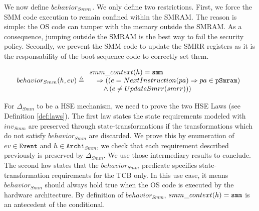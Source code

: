We now define $behavior_{Smm}$. We only define two
restrictions. First, we force the SMM code execution to remain confined within
the SMRAM. The reason is simple: the OS code can tamper with the memory outside
the SMRAM. As a consequence, jumping outside the SMRAM is the best way to fail
the security policy. Secondly, we prevent the SMM code to update the SMRR
registers as it is the responsability of the boot sequence code to correctly set
them.

\[
  behavior_{Smm}(h, ev) \triangleq \begin{array}{l}
                                           smm\_context(h) = \mathtt{smm} \\
                                           \quad \Rightarrow ((e =
                                           NextInstruction(pa)
                                           \Rightarrow pa \in \texttt{pSmram}) \\
                                           \qquad \wedge\,(e \neq UpdateSmrr(smrr))) \\
                                         \end{array}
                                       \]

                                       For $\Delta_{Smm}$ to be a HSE mechanism,
                                       we need to prove the two HSE Laws (see
                                       Definition \ref{def:laws}).  The first
                                       law states the state requirements modeled
                                       with $inv_{Smm}$ are preserved through
                                       state-transformations if the
                                       transformations which do not satisfy
                                       $behavior_{Smm}$ are discarded. We prove
                                       this by enumeration of
                                       $ev \in \texttt{Event}$ and
                                       $h \in \texttt{Archi}_{Smm}$, we check
                                       that each requirement described
                                       previously is preserved by
                                       $\Delta_{Smm}$. We use those intermediary
                                       results to conclude. The second law
                                       states that the $behavior_{Smm}$
                                       predicate specifies
                                       state-trans\-formation requirements for
                                       the TCB only. In this use case, it means
                                       $behavior_{Smm}$ should always hold true
                                       when the OS code is executed by the
                                       hardware architecture.  By definition of
                                       $behavior_{Smm}$,
                                       $smm\_context(h) = \mathtt{smm}$ is an
                                       antecedent of the conditional.


